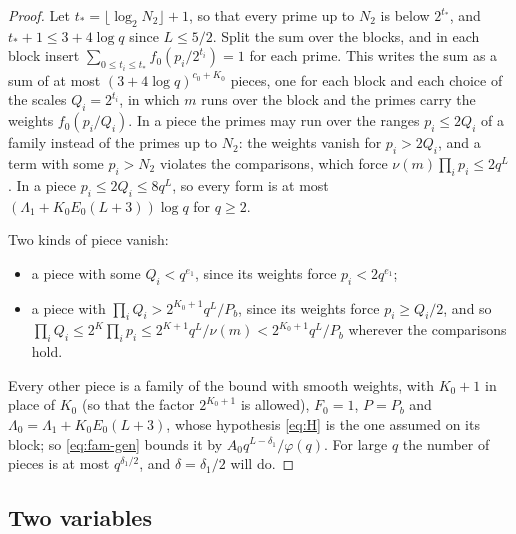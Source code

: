 \documentclass[11pt]{article}
\numberwithin{equation}{section}
\begin{document}
\begin{proof}
Let $t_* = \lfloor \log_2 N_2 \rfloor + 1$, so that every prime up to $N_2$ is below $2^{t_*}$, and $t_* + 1 \le 3 + 4
\log q$ since $L \le 5/2$. Split the sum over the blocks, and in each block insert $\sum_{0 \le t_i \le t_*}
f_0(p_i/2^{t_i}) = 1$ for each prime. This writes the sum as a sum of at most $(3 + 4 \log q)^{c_0 + K_0}$ pieces, one
for each block and each choice of the scales $Q_i = 2^{t_i}$, in which $m$ runs over the block and the primes carry the
weights $f_0(p_i/Q_i)$. In a piece the primes may run over the ranges $p_i \le 2Q_i$ of a family instead of the primes
up to $N_2$: the weights vanish for $p_i > 2Q_i$, and a term with some $p_i > N_2$ violates the comparisons, which force
$\nu(m) \prod_i p_i \le 2q^L$. In a piece $p_i \le 2Q_i \le 8q^L$, so every form is at most $(\Lambda_1 + K_0 E_0 (L +
3)) \log q$ for $q \ge 2$.

Two kinds of piece vanish:
\begin{itemize}
\item a piece with some $Q_i < q^{e_1}$, since its weights force $p_i < 2q^{e_1}$;
\item a piece with $\prod_i Q_i > 2^{K_0 + 1} q^L/P_b$, since its weights force $p_i \ge Q_i/2$, and so $\prod_i Q_i
  \le 2^K \prod_i p_i \le 2^{K + 1} q^L/\nu(m) < 2^{K_0 + 1} q^L/P_b$ wherever the comparisons hold.
\end{itemize}
Every other piece is a family of the bound with smooth weights, with $K_0 + 1$ in place of $K_0$ (so that the
factor $2^{K_0 + 1}$ is allowed), $F_0 = 1$, $P = P_b$ and $\Lambda_0 = \Lambda_1 + K_0 E_0 (L + 3)$, whose hypothesis
\eqref{eq:H} is the one assumed on its block; so \eqref{eq:fam-gen} bounds it by $A_0 q^{L - \delta_1}/\varphi(q)$.
For large $q$ the number of pieces is at most $q^{\delta_1/2}$, and
$\delta = \delta_1/2$ will do.
\end{proof}

\subsection*{Two variables}
\end{document}
